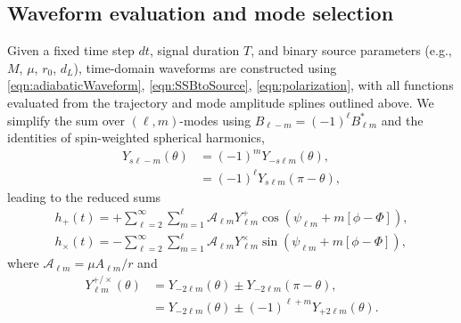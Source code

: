 \documentclass[%
 reprint,
 nofootinbib,
 amsmath,amssymb,
 aps,
 prd,
]{revtex4-2}
\begin{document}
\subsection{Waveform evaluation and mode selection}
\label{sec:wave}

Given a fixed time step $dt$, signal duration $T$, and binary source parameters (e.g., $M$, $\mu$, $r_0$, $d_L$), time-domain waveforms are constructed using \eqref{eqn:adiabaticWaveform}, \eqref{eqn:SSBtoSource}, \eqref{eqn:polarization}, with all functions evaluated from the trajectory and mode amplitude splines outlined above. We simplify the sum over $(\ell, m)$-modes using $B_{\ell -m} = (-1)^\ell B^*_{\ell m}$ and the identities of spin-weighted spherical harmonics,
\begin{subequations}
    \begin{align}
    Y_{s\ell -m}(\theta) &= (-1)^{m} Y_{-s \ell m}(\theta),
    \\
    &= (-1)^{\ell} Y_{s \ell m}(\pi-\theta),
    \end{align}
\end{subequations}
leading to the reduced sums
\begin{subequations} \label{eqn:timeDomainReduced}
    \begin{align}
    h_+(t) = +\sum_{\ell=2}^\infty \sum_{ m = 1}^{\ell} \mathcal{A}_{\ell m} Y^+_{\ell m} \cos(\psi_{\ell m} + m[\phi - \Phi]),
    \\
    h_\times(t) = -\sum_{\ell=2}^\infty \sum_{ m = 1}^{\ell}  \mathcal{A}_{\ell m} Y^\times_{\ell m} \sin(\psi_{\ell m} + m[\phi - \Phi]),
\end{align}
\end{subequations}
where $\mathcal{A}_{\ell m} = \mu A_{\ell m}/r$ and
\begin{subequations}
    \begin{align}
    Y^{+/\times}_{\ell m}(\theta) &= Y_{-2\ell m}(\theta) \pm Y_{-2\ell m}(\pi - \theta),
    \\
    &= Y_{-2\ell m}(\theta) \pm (-1)^{\ell + m} Y_{+2\ell m}(\theta).
    \end{align}
\end{subequations}
\end{document}
